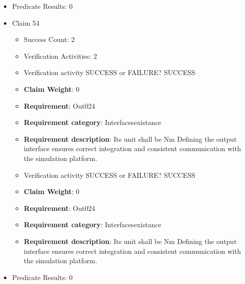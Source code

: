 \documentclass{article}
\begin{document}
\begin{itemize}
\begin{itemize}
					\item Verification activity SUCCESS or FAILURE? SUCCESS
					\item \textbf{Claim Weight}: 0
						\item \textbf{Requirement}: Out023 
						\item \textbf{Requirement category}: Interfacesexistance 
						\item \textbf{Requirement description}: Its unit shall be noUnit Defining the output interface ensures correct integration and consistent communication with the simulation platform.
					
				\end{itemize}
				
									    
				\item Predicate Results: 0

  				  \item Claim 54
				\begin{itemize}
			    	\item Success Count: 2 
			    	\item Verification Activities: 2
					\item Verification activity SUCCESS or FAILURE? SUCCESS
					\item \textbf{Claim Weight}: 0
						\item \textbf{Requirement}: Out024 
						\item \textbf{Requirement category}: Interfacesexistance 
						\item \textbf{Requirement description}: Its unit shall be Nm Defining the output interface ensures correct integration and consistent communication with the simulation platform.
					
					\item Verification activity SUCCESS or FAILURE? SUCCESS
					\item \textbf{Claim Weight}: 0
						\item \textbf{Requirement}: Out024 
						\item \textbf{Requirement category}: Interfacesexistance 
						\item \textbf{Requirement description}: Its unit shall be Nm Defining the output interface ensures correct integration and consistent communication with the simulation platform.
					
				\end{itemize}
				
									    
				\item Predicate Results: 0


\end{itemize}
\end{document}
